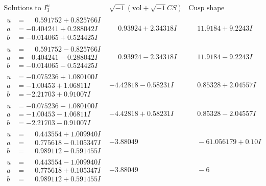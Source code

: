 \documentclass[1p]{elsarticle_modified}
\theoremstyle{definition}
\newcommand{\I}{\sqrt{-1}}
\begin{document}
$$\begin{array}{c|c|c}  
\text{Solutions to }I^u_{3}& \I (\text{vol} + \sqrt{-1}CS) & \text{Cusp shape}\\
 \hline 
\begin{aligned}
u &= \phantom{-}0.591752 + 0.825766 I \\
a &= -0.404241 + 0.288042 I \\
b &= -0.014065 + 0.524425 I\end{aligned}
 & \phantom{-}0.93924 + 2.34318 I & \phantom{-}11.9184 + 9.2243 I \\ \hline\begin{aligned}
u &= \phantom{-}0.591752 - 0.825766 I \\
a &= -0.404241 - 0.288042 I \\
b &= -0.014065 - 0.524425 I\end{aligned}
 & \phantom{-}0.93924 - 2.34318 I & \phantom{-}11.9184 - 9.2243 I \\ \hline\begin{aligned}
u &= -0.075236 + 1.080100 I \\
a &= -1.00453 + 1.06811 I \\
b &= -2.21703 + 0.91007 I\end{aligned}
 & -4.42818 - 0.58231 I & \phantom{-}0.85328 + 2.04557 I \\ \hline\begin{aligned}
u &= -0.075236 - 1.080100 I \\
a &= -1.00453 - 1.06811 I \\
b &= -2.21703 - 0.91007 I\end{aligned}
 & -4.42818 + 0.58231 I & \phantom{-}0.85328 - 2.04557 I \\ \hline\begin{aligned}
u &= \phantom{-}0.443554 + 1.009940 I \\
a &= \phantom{-}0.775618 - 0.105347 I \\
b &= \phantom{-}0.989112 - 0.591455 I\end{aligned}
 & -3.88049\phantom{ +0.000000I} & \phantom{-}                -6
1.056179 + 0. 10   I\phantom{ +0.000000I} \\ \hline\begin{aligned}
u &= \phantom{-}0.443554 - 1.009940 I \\
a &= \phantom{-}0.775618 + 0.105347 I \\
b &= \phantom{-}0.989112 + 0.591455 I\end{aligned}
 & -3.88049\phantom{ +0.000000I} & \phantom{-}                -6

\end{array}$$
\end{document}
